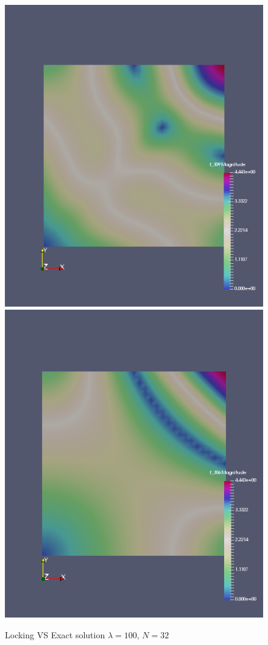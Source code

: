\documentclass[a4paper,norsk]{article}
\begin{document}
\begin{figure}[h!]
        \centering
        \caption*{Locking VS Exact solution $\lambda = 100$, $N = 32$}
        \includegraphics[scale=0.4]{lock.png}
        \includegraphics[scale=0.4]{exnolock.png}
\end{figure}
\end{document}

